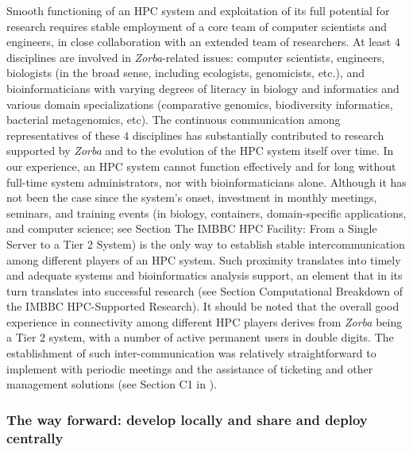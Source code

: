    Smooth functioning of an HPC system and exploitation of its full potential for research requires stable employment of a core team of computer scientists and engineers, in close collaboration with an extended team of researchers. 
   At least $4$ disciplines are involved in \textit{Zorba}-related issues: 
   computer scientists, engineers, biologists (in the broad sense, including ecologists, genomicists, etc.), and bioinformaticians with varying degrees of literacy in biology and informatics and various domain specializations (comparative genomics, biodiversity informatics, bacterial metagenomics, etc). 
   The continuous communication among representatives of these $4$ disciplines has substantially contributed to research supported by \textit{Zorba} and to the evolution of the HPC system itself over time. 
   In our experience, an HPC system cannot function effectively and for long without full-time system administrators, nor with bioinformaticians alone. 
   Although it has not been the case since the system's onset, investment in monthly meetings, seminars, and training events (in biology, containers, domain-specific applications, and computer science; see Section The IMBBC HPC Facility: From a Single Server to a Tier 2 System) is the only way to establish stable intercommunication among different players of an HPC system. 
   Such proximity translates into timely and adequate systems and bioinformatics analysis support, an element that in its turn translates into successful research (see Section Computational Breakdown of the IMBBC HPC-Supported Research). 
   It should be noted that the overall good experience in connectivity among different HPC players derives from \textit{Zorba} being a Tier 2 system, with a number of active permanent users in double digits. The establishment of such inter-communication was relatively straightforward to implement with periodic meetings and the assistance of ticketing and other management solutions (see Section C1 in \citep{haris_zafeiropoulos_2021_4665308}).


   \subsubsection*{The way forward: develop locally and share and deploy centrally}
   
